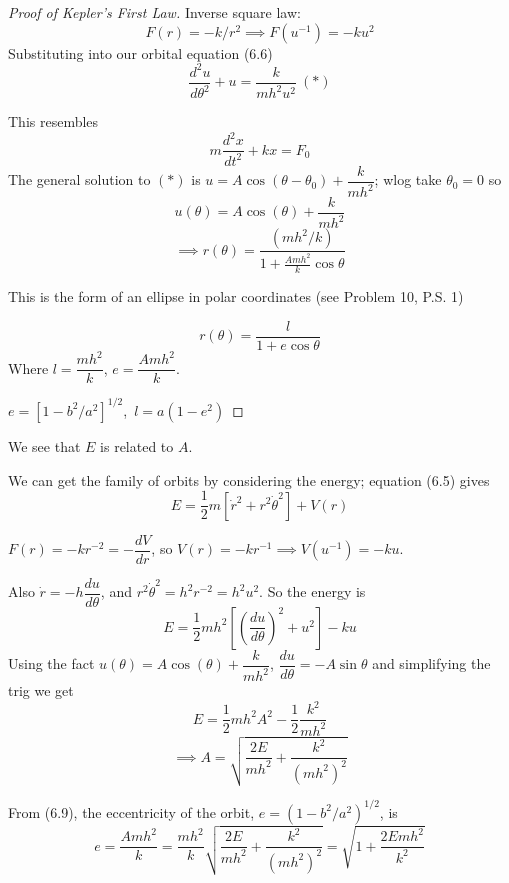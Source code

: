 \begin{proof}[Proof of Kepler's First Law]
Inverse square law:
\[F(r) = -k/r^2 \implies F(u^{-1}) = -ku^2\]
Substituting into our orbital equation (6.6)
\[\frac{d^2u}{d\theta^2} + u = \frac{k}{mh^2u^2} ~(*)\]

This resembles \[m\frac{d^2x}{dt^2} + kx = F_0\]
The general solution to $(*)$ is $u = A\cos(\theta-\theta_0) + \dfrac{k}{mh^2}$;
 wlog take $\theta_0 = 0$ so
\[u(\theta) = A\cos(\theta) + \dfrac{k}{mh^2}\]
\begin{equation}\implies r(\theta) = \frac{(mh^2/k)}{1 + \frac{Amh^2}{k}\cos\theta}\end{equation}


This is the form of an ellipse in polar coordinates (see Problem 10, P.S. 1)
 
\[r(\theta) = \frac{l}{1 + e\cos\theta}\]
Where $l = \dfrac{mh^2}{k}$, $e = \dfrac{Amh^2}{k}$. \vspace*{150pt}

$e = [1-b^2/a^2]^{1/2}$,~$l = a(1-e^2)$ \end{proof}

We see that $E$ is related to $A$.
 
We can get the family of orbits by considering the energy; equation (6.5) gives
\[E = \frac{1}{2}m[\dot{r}^2 + r^2\dot{\theta}^2] + V(r)\]
 
 
 $F(r) =-kr^{-2} = -\dfrac{dV}{dr}$, so $ V(r) = -kr^{-1} \implies V(u^{-1}) = -ku$. 

Also $\dot{r} = -h\dfrac{du}{d\theta}$, and $r^2\dot{\theta}^2 = h^2r^{-2} = h^2u^2$. So the energy is
\[E = \frac{1}{2}mh^2\left[\left(\frac{du}{d\theta}\right)^2 + u^2\right]-ku\]
Using the fact $u(\theta) = A\cos(\theta) + \dfrac{k}{mh^2}$, $\dfrac{du}{d\theta} = -A\sin\theta$ and simplifying the trig we get
\[E = \frac{1}{2}mh^2A^2 - \frac{1}{2}\frac{k^2}{mh^2}\]
\[\implies A = \sqrt{\frac{2E}{mh^2} + \frac{k^2}{(mh^2)^2} }\]


From (6.9), the eccentricity of the orbit, $e = (1-b^2/a^2)^{1/2}$, is
\[e = \frac{Amh^2}{k} = \frac{mh^2}{k}\sqrt{\frac{2E}{mh^2} + \frac{k^2}{(mh^2)^2} } = \sqrt{1 + \frac{2Emh^2}{k^2}}\]
	

